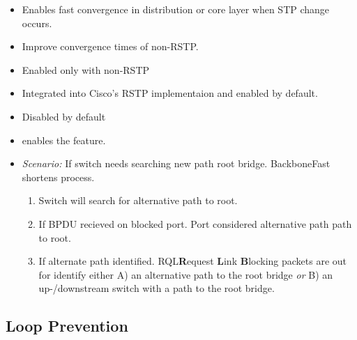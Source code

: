 \begin{itemize}
    \begin{itemize}
        \item Enables fast convergence in distribution or core layer when STP change occurs.
        \item Improve convergence times of non-RSTP.
        \item Enabled only with non-RSTP
        \item Integrated into Cisco's RSTP implementaion and enabled by default.
        \item Disabled by default
        \item {} enables the feature.
        \item \textit{Scenario:} If switch needs searching new path root bridge. BackboneFast shortens process.
        \begin{enumerate}
            \item Switch will search for alternative path to root.
            \item If BPDU recieved on blocked port. Port considered alternative path path to root.
            \item If alternate path identified. RQL{\footnotesize \textbf{R}equest \textbf{L}ink \textbf{B}locking} packets are out for identify either A) an alternative path to the root bridge \textit{or} B) an up-/downstream switch with a path to the root bridge.
        \end{enumerate}
    \end{itemize}
\end{itemize}

\subsection{Loop Prevention}

